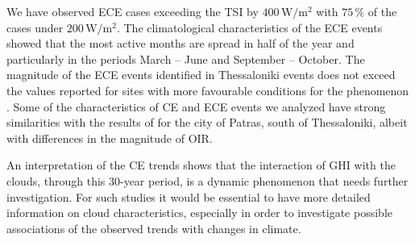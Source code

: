 \documentclass[preprint, 5p,
authoryear]{elsarticle} %
\begin{document}
We have observed ECE cases exceeding the TSI by
\(400\,\text{W}/\text{m}^{2}\) with \(75\,\%\) of the cases under
\(200\,\text{W}/\text{m}^{2}\). The climatological characteristics of
the ECE events showed that the most active months are spread in half of
the year and particularly in the periods March -- June and September --
October. The magnitude of the ECE events identified in Thessaloniki
events does not exceed the values reported for sites with more
favourable conditions for the phenomenon \citep[e.g.,][]{Cordero2023}.
Some of the characteristics of CE and ECE events we analyzed have strong
similarities with the results of \citet{Vamvakas2020} for the city of
Patras, south of Thessaloniki, albeit with differences in the magnitude
of OIR.

An interpretation of the CE trends shows that the interaction of GHI
with the clouds, through this 30-year period, is a dynamic phenomenon
that needs further investigation. For such studies it would be essential
to have more detailed information on cloud characteristics, especially
in order to investigate possible associations of the observed trends
with changes in climate.


\end{document}
